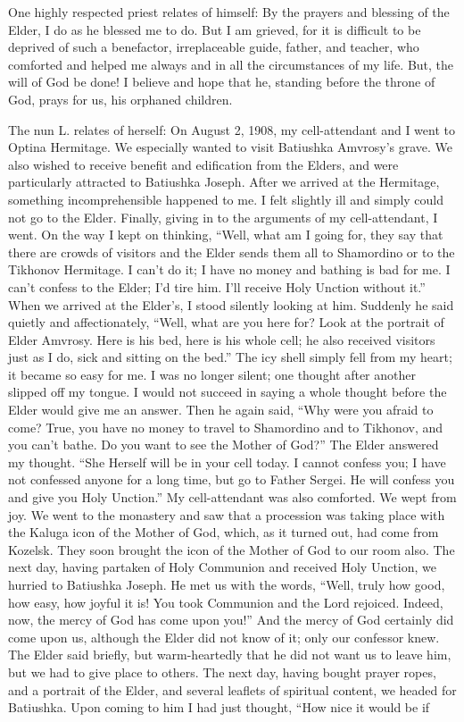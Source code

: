 \begin{longquote}{One highly respected priest relates of himself: }
By the prayers and blessing of the Elder, I do as he blessed me to do. But I am grieved, for it is difficult to be deprived of such a benefactor, irreplaceable guide, father, and teacher, who comforted and helped me always and in all the circumstances of my life. But, the will of God be done! I believe and hope that he, standing before the throne of God, prays for us, his orphaned children.
\end{longquote}

\begin{longquote}{The nun L. relates of herself: }
On August 2, 1908, my cell-attendant and I went to Optina Hermitage. We especially wanted to visit Batiushka Amvrosy’s grave. We also wished to receive benefit and edification from the Elders, and were particularly attracted to Batiushka Joseph. After we arrived at the Hermitage, something incomprehensible happened to me. I felt slightly ill and simply could not go to the Elder. Finally, giving in to the arguments of my cell-attendant, I went. On the way I kept on thinking, ``Well, what am I going for, they say that there are crowds of visitors and the Elder sends them all to Shamordino or to the Tikhonov Hermitage. I can't do it; I have no money and bathing is bad for me. I can't confess to the Elder; I'd tire him. I'll receive Holy Unction without it.'' When we arrived at the Elder's, I stood silently looking at him. Suddenly he said quietly and affectionately, ``Well, what are you here for? Look at the portrait of Elder Amvrosy. Here is his bed, here is his whole cell; he also received visitors just as I do, sick and sitting on the bed.'' The icy shell simply fell from my heart; it became so easy for me. I was no longer silent; one thought after another slipped off my tongue. I would not succeed in saying a whole thought before the Elder would give me an answer. Then he again said, ``Why were you afraid to come? True, you have no money to travel to Shamordino and to Tikhonov, and you can't bathe. Do you want to see the Mother of God?'' The Elder answered my thought. ``She Herself will be in your cell today. I cannot confess you; I have not confessed anyone for a long time, but go to Father Sergei. He will confess you and give you Holy Unction.'' My cell-attendant was also comforted. We wept from joy. We went to the monastery and saw that a procession was taking place with the Kaluga icon of the Mother of God, which, as it turned out, had come from Kozelsk. They soon brought the icon of the Mother of God to our room also. The next day, having partaken of Holy Communion and received Holy Unction, we hurried to Batiushka Joseph. He met us with the words, ``Well, truly how good, how easy, how joyful it is! You took Communion and the Lord rejoiced. Indeed, now, the mercy of God has come upon you!'' And the mercy of God certainly did come upon us, although the Elder did not know of it; only our confessor knew. The Elder said briefly, but warm-heartedly that he did not want us to leave him, but we had to give place to others. The next day, having bought prayer ropes, and a portrait of the Elder, and several leaflets of spiritual content, we headed for Batiushka. Upon coming to him I had just thought, ``How nice it would be if 
\end{longquote}
